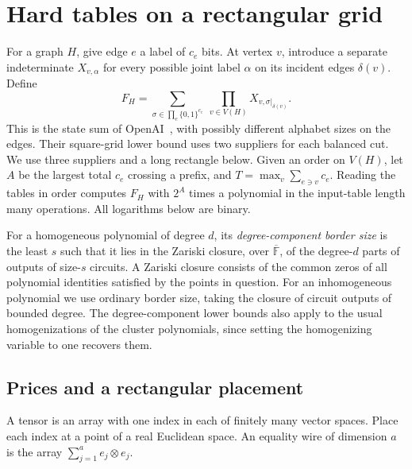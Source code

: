 \documentclass[11pt]{article}
\theoremstyle{definition}
\newcommand{\F}{\mathbb F}
\newcommand{\bits}{\{0,1\}}
\newcommand{\olF}{\overline{\F}}
\begin{document}
\section{Hard tables on a rectangular grid}\label{sec:tables}

For a graph \(H\), give edge \(e\) a label of \(c_e\) bits. At vertex \(v\), introduce a separate indeterminate \(X_{v,\alpha}\) for every possible joint label \(\alpha\) on its incident edges \(\delta(v)\). Define
\begin{equation}\label{eq:source}
 F_H=\sum_{\sigma\in\prod_e\bits^{c_e}}\ \prod_{v\in V(H)}X_{v,\sigma|_{\delta(v)}}.
\end{equation}
This is the state sum of OpenAI~\cite[Sections~3--4]{paths-trees-grids}, with possibly different alphabet sizes on the edges. Their square-grid lower bound uses two suppliers for each balanced cut. We use three suppliers and a long rectangle below.
Given an order on \(V(H)\), let \(A\) be the largest total \(c_e\) crossing a prefix, and \(T=\max_v\sum_{e\ni v}c_e\). Reading the tables in order computes \(F_H\) with \(2^A\) times a polynomial in the input-table length many operations. All logarithms below are binary.

For a homogeneous polynomial of degree \(d\), its \emph{degree-component border size} is the least \(s\) such that it lies in the Zariski closure, over \(\olF\), of the degree-\(d\) parts of outputs of size-\(s\) circuits. A Zariski closure consists of the common zeros of all polynomial identities satisfied by the points in question. For an inhomogeneous polynomial we use ordinary border size, taking the closure of circuit outputs of bounded degree. The degree-component lower bounds also apply to the usual homogenizations of the cluster polynomials, since setting the homogenizing variable to one recovers them.

\subsection{Prices and a rectangular placement}

A tensor is an array with one index in each of finitely many vector spaces. Place each index at a point of a real Euclidean space. An equality wire of dimension \(a\) is the array \(\sum_{j=1}^a e_j\otimes e_j\).
\end{document}
